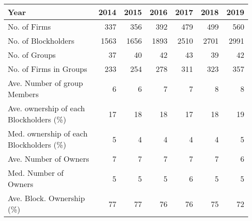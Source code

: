 \begin{tabular}{lrrrrrr}
\toprule
Year &  2014 &  2015 &  2016 &  2017 &  2018 &  2019 \\
\midrule
No. of Firms                            &   337 &   356 &   392 &   479 &   499 &   560 \\
No. of Blockholders                     &  1563 &  1656 &  1893 &  2510 &  2701 &  2991 \\
No. of Groups                           &    37 &    40 &    42 &    43 &    39 &    42 \\
No. of Firms in Groups                  &   233 &   254 &   278 &   311 &   323 &   357 \\
Ave. Number of group Members            &     6 &     6 &     7 &     7 &     8 &     8 \\
Ave. ownership of each Blockholders (\%) &    17 &    18 &    18 &    17 &    18 &    19 \\
Med. ownership of each Blockholders (\%) &     5 &     4 &     4 &     4 &     4 &     5 \\
Ave. Number of Owners                   &     7 &     7 &     7 &     7 &     7 &     6 \\
Med. Number of Owners                   &     5 &     5 &     5 &     6 &     5 &     5 \\
Ave. Block. Ownership (\%)               &    77 &    77 &    76 &    76 &    75 &    72 \\
\bottomrule
\end{tabular}
